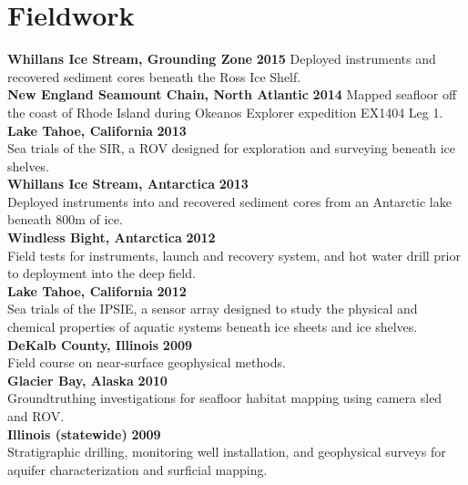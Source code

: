 \section{Fieldwork} 
\textbf{Whillans Ice Stream, Grounding Zone} \hfill \textbf{2015}
Deployed instruments and recovered sediment cores beneath the Ross Ice Shelf. \\ 

\textbf{New England Seamount Chain, North Atlantic} \hfill \textbf{2014}
Mapped seafloor off the coast of Rhode Island during Okeanos Explorer expedition EX1404 Leg 1. \\

\textbf{Lake Tahoe, California} \hfill \textbf{2013}\\
Sea trials of the SIR, a ROV designed for exploration and surveying beneath ice shelves.\\

\textbf{Whillans Ice Stream, Antarctica} \hfill \textbf{2013}\\
Deployed instruments into and recovered sediment cores from an Antarctic lake beneath 800m of ice.\\

\textbf{Windless Bight, Antarctica} \hfill \textbf{2012}\\
Field tests for instruments, launch and recovery system, and hot water drill prior to deployment into the deep field.\\

 \textbf{Lake Tahoe, California} \hfill \textbf{2012}\\
Sea trials of the IPSIE, a sensor array designed to study the physical and chemical properties of aquatic systems beneath ice sheets and ice shelves.\\

\textbf{DeKalb County, Illinois} \hfill \textbf{2009}\\
Field course on near-surface geophysical methods.\\

\textbf{Glacier Bay, Alaska} \hfill \textbf{2010}\\
Groundtruthing investigations for seafloor habitat mapping using camera sled and ROV.\\

\textbf{Illinois (statewide)} \hfill \textbf{2009}\\
Stratigraphic drilling, monitoring well installation, and geophysical surveys for aquifer characterization and surficial mapping. \\
